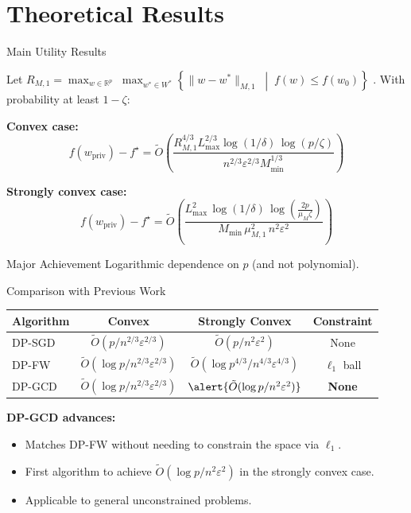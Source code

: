 \documentclass[10pt]{beamer}
\begin{document}
\section{Theoretical Results}

\begin{frame}{Main Utility Results}
\begin{theorem}
Let
$R_{M,1} = \max_{w \in \mathbb{R}^p} \; \max_{w^* \in W^*} \left\{ \|w - w^*\|_{M,1} \;\middle|\; f(w) \le f(w_0) \right\}$
. With probability at least $1 - \zeta$:

\vspace{0.5em}
\textbf{Convex case:}
\[
f(w_{\text{priv}}) - f^\star =
\tilde{O}\!\left(
\frac{R_{M,1}^{4/3} L_{\max}^{2/3} \log(1/\delta)\,\log(p/\zeta)}
{n^{2/3} \varepsilon^{2/3} M_{\min}^{1/3}}
\right)
\]

\textbf{Strongly convex case:}
\[
f(w_{\text{priv}}) - f^\star =
\tilde{O}\!\left(
\frac{L_{\max}^{2}\,\log(1/\delta)\,\log\!\left(\frac{2p}{\mu_M \zeta}\right)}
{M_{\min}\,\mu_{M,1}^{2}\,n^{2} \varepsilon^{2}}
\right)
\]
\end{theorem}

\vspace{1em}
\begin{alertblock}{Major Achievement}
\alert{Logarithmic} dependence on $p$ (and not polynomial).
\end{alertblock}
\end{frame}

\begin{frame}{Comparison with Previous Work}
\begin{table}
\footnotesize
\begin{tabular}{@{}lccc@{}}
\toprule
\textbf{Algorithm} & \textbf{Convex} & \textbf{Strongly Convex} & \textbf{Constraint} \\
\midrule
DP-SGD & $\tilde{O}(p/n^{2/3}\varepsilon^{2/3})$ & $\tilde{O}(p/n^2\varepsilon^2)$ & None \\
DP-FW & $\tilde{O}(\log p/n^{2/3}\varepsilon^{2/3})$ & $\tilde{O}(\log p^{4/3}/n^{4/3}\varepsilon^{4/3})$ & $\ell_1$ ball \\
\rowcolor{yellow!30}
DP-GCD & $\tilde{O}(\log p/n^{2/3}\varepsilon^{2/3})$ & $\alert{\tilde{O}(\log p/n^2\varepsilon^2)}$ & \textbf{None} \\
\bottomrule
\end{tabular}
\end{table}

\vspace{1em}
\textbf{DP-GCD advances:}
\begin{itemize}
\item Matches DP-FW without needing to constrain the space via $\ell_1$.
\item \alert{First} algorithm to achieve $\tilde{O}(\log p / n^2\varepsilon^2)$ in the strongly convex case.
\item Applicable to general unconstrained problems.
\end{itemize}
\end{frame}
\end{document}
